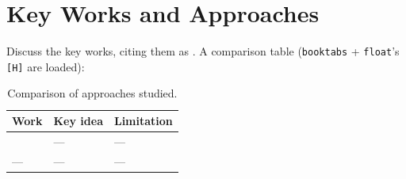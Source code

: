 \section{Key Works and Approaches}
\label{sec:learnt-keyworks}


Discuss the key works, citing them as \cite{example2020}. A comparison
table (\texttt{booktabs} + \texttt{float}'s \texttt{[H]} are loaded):

\begin{table}[H]
  \centering
  \caption{Comparison of approaches studied.}
  \label{tab:approaches}
  \begin{tabular}{lll}
    \toprule
    Work & Key idea & Limitation \\
    \midrule
    \cite{example2020} & --- & --- \\
    ---                & --- & --- \\
    \bottomrule
  \end{tabular}
\end{table}
